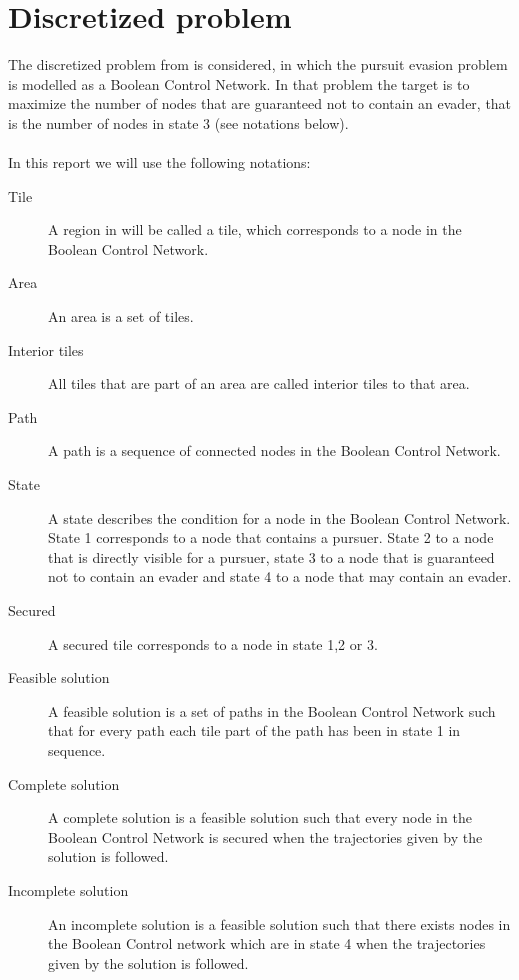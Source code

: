\section{Discretized problem}\label{discretizedproblem}
The discretized problem from \cite{paper1} is considered, in which the pursuit evasion problem is modelled as a Boolean Control Network. In that problem the target is to maximize the number of nodes that are guaranteed not to contain an evader, that is the number of nodes in state 3 (see notations below).\\
\\
In this report we will use the following notations:
\begin{description}
\item[Tile] A region in \cite{paper1} will be called a tile, which corresponds to a node in the Boolean Control Network.
\item[Area]An area is a set of tiles.
\item[Interior tiles] All tiles that are part of an area are called interior tiles to that area.
\item[Path]A path is a sequence of connected nodes in the Boolean Control Network.
\item[State]A state describes the condition for a node in the Boolean Control Network. State 1 corresponds to a node that contains a pursuer. State 2 to a node that is directly visible for a pursuer, state 3 to a node that is guaranteed not to contain an evader and state 4 to a node that may contain an evader.
\item[Secured]A secured tile corresponds to a node in state 1,2 or 3.
\item[Feasible solution]A feasible solution is a set of paths in the Boolean Control Network such that for every path each tile part of the path has been in state 1 in sequence.
\item[Complete solution]A complete solution is a feasible solution such that every node in the Boolean Control Network is secured when the trajectories given by the solution is followed.
\item[Incomplete solution]An incomplete solution is a feasible solution such that there exists nodes in the Boolean Control network which are in state 4 when the trajectories given by the solution is followed.
\end{description}

